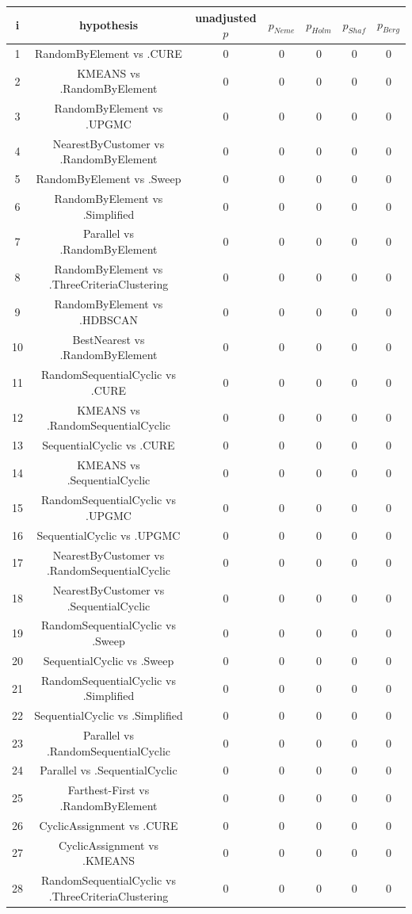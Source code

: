 \documentclass[a4paper,10pt]{article}
\begin{document}
\begin{landscape}
\begin{table}[!htp]
\centering\scriptsize
\begin{tabular}{ccccccc}
i&hypothesis&unadjusted $p$&$p_{Neme}$&$p_{Holm}$&$p_{Shaf}$&$p_{Berg}$\\
\hline1&RandomByElement vs .CURE&0&0&0&0&0\\
2&KMEANS vs .RandomByElement&0&0&0&0&0\\
3&RandomByElement vs .UPGMC&0&0&0&0&0\\
4&NearestByCustomer vs .RandomByElement&0&0&0&0&0\\
5&RandomByElement vs .Sweep&0&0&0&0&0\\
6&RandomByElement vs .Simplified&0&0&0&0&0\\
7&Parallel vs .RandomByElement&0&0&0&0&0\\
8&RandomByElement vs .ThreeCriteriaClustering&0&0&0&0&0\\
9&RandomByElement vs .HDBSCAN&0&0&0&0&0\\
10&BestNearest vs .RandomByElement&0&0&0&0&0\\
11&RandomSequentialCyclic vs .CURE&0&0&0&0&0\\
12&KMEANS vs .RandomSequentialCyclic&0&0&0&0&0\\
13&SequentialCyclic vs .CURE&0&0&0&0&0\\
14&KMEANS vs .SequentialCyclic&0&0&0&0&0\\
15&RandomSequentialCyclic vs .UPGMC&0&0&0&0&0\\
16&SequentialCyclic vs .UPGMC&0&0&0&0&0\\
17&NearestByCustomer vs .RandomSequentialCyclic&0&0&0&0&0\\
18&NearestByCustomer vs .SequentialCyclic&0&0&0&0&0\\
19&RandomSequentialCyclic vs .Sweep&0&0&0&0&0\\
20&SequentialCyclic vs .Sweep&0&0&0&0&0\\
21&RandomSequentialCyclic vs .Simplified&0&0&0&0&0\\
22&SequentialCyclic vs .Simplified&0&0&0&0&0\\
23&Parallel vs .RandomSequentialCyclic&0&0&0&0&0\\
24&Parallel vs .SequentialCyclic&0&0&0&0&0\\
25&Farthest-First vs .RandomByElement&0&0&0&0&0\\
26&CyclicAssignment vs .CURE&0&0&0&0&0\\
27&CyclicAssignment vs .KMEANS&0&0&0&0&0\\
28&RandomSequentialCyclic vs .ThreeCriteriaClustering&0&0&0&0&0\\

\end{tabular}
\end{table}
\end{landscape}
\end{document}
